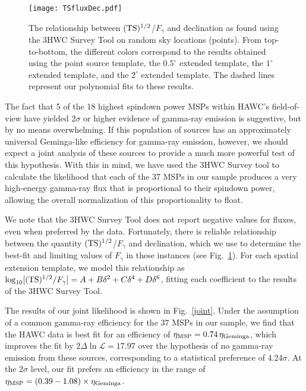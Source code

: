 \documentclass[aps,prd,twocolumn,amsmath,superscriptaddress,amssymb,showpacs,floatfix,nofootinbib,longbibliography,preprintnumbers]{revtex4-1}
\begin{document}
\begin{figure}
\texttt{[image: TSfluxDec.pdf]}
\caption{The relationship between $({\rm TS})^{1/2}$/$F_{\gamma}$ and declination as found using the 3HWC Survey Tool on random sky locations (points). From top-to-bottom, the different colors correspond to the results obtained using the point source template, the $0.5^{\circ}$ extended template, the $1^{\circ}$ extended template, and the $2^{\circ}$ extended template. The dashed lines represent our polynomial fits to these results.}
\label{TSdec}
\end{figure}

The fact that 5 of the 18 highest spindown power MSPs within HAWC's field-of-view have yielded $2\sigma$ or higher evidence of gamma-ray emission is suggestive, but by no means overwhelming. If this population of sources has an approximately universal Geminga-like efficiency for gamma-ray emission, however, we should expect a joint analysis of these sources to provide a much more powerful test of this hypothesis. With this in mind, we have used the 3HWC Survey tool to calculate the likelihood that each of the 37 MSPs in our sample produces a very high-energy gamma-ray flux that is proportional to their spindown power, allowing the overall normalization of this proportionality to float.



We note that the 3HWC Survey Tool does not report negative values for fluxes, even when preferred by the data. Fortunately, there is reliable relationship between the quantity $({\rm TS})^{1/2}$/$F_{\gamma}$ and declination, which we use to determine the best-fit and limiting values of $F_{\gamma}$ in these instances (see Fig.~\ref{TSdec}). For each spatial extension template, we model this relationship as $\log_{10} [({\rm TS})^{1/2}/F_{\gamma}] = A +B \delta^2 +C \delta^4 +D \delta^6$, fitting each coefficient to the results of the 3HWC Survey Tool.




The results of our joint likelihood is shown in Fig.~\ref{joint}. Under the assumption of a common gamma-ray efficiency for the 37 MSPs in our sample, we find that the HAWC data is best fit for an efficiency of $\eta_{\rm MSP} = 0.74 \, \eta_{\rm Geminga}$, which improves the fit by $2\Delta \ln \mathcal{L} = 17.97$ over the hypothesis of no gamma-ray emission from these sources, corresponding to a statistical preference of 4.24$\sigma$. At the $2\sigma$ level, our fit prefers an efficiency in the range of $\eta_{\rm MSP} = (0.39-1.08) \times \eta_{\rm Geminga}$.
\end{document}
